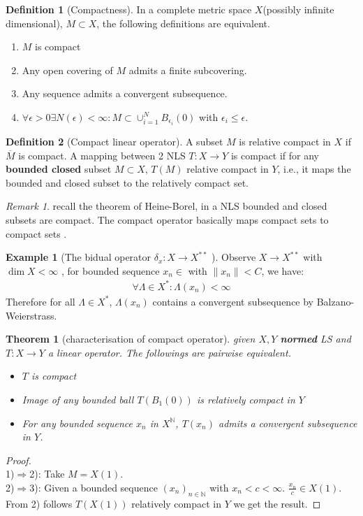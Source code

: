 \documentclass[a4paper,11pt,fleqn]{book}
\newtheorem{theorem}{Theorem}[section]
\theoremstyle{definition}
\newtheorem{definition}{Definition}[section]
\newtheorem*{example}{Example}
\theoremstyle{remark}
\newtheorem*{remark}{Remark}
\begin{document}
\begin{definition}[Compactness]
	In a complete metric space $X$(possibly infinite dimensional), $M \subset X$, the following definitions are equivalent.
	\begin{enumerate}
		\item $M$ is compact
		\item Any open covering of $M$ admits a finite subcovering.
		\item Any sequence admits a convergent subsequence. 
		\item $\forall \epsilon > 0 \exists N(\epsilon) < \infty: M \subset \cup_{i = 1}^N B_{\epsilon_i}(0)$ with $\epsilon_i \le \epsilon$. 
	\end{enumerate}
\end{definition}


\begin{definition}[Compact linear operator]
	A subset $M$ is relative compact in $X$ if $\overline{M}$ is compact. A mapping between 2 NLS $T:X\rightarrow Y$ is compact if for any \textbf{bounded closed} subset $M \subset X$, $T(M)$ relative compact in $Y$, i.e., it maps the bounded and closed subset to the relatively compact set. 
\end{definition}
\begin{remark}
recall the theorem of Heine-Borel, in a NLS bounded and closed subsets are compact. The compact operator basically maps compact sets to compact sets	.
\end{remark}


\begin{example}[The bidual operator $\delta_x: X \rightarrow X^{**}$ ]
	Observe $X \rightarrow X^{**}$ with $\dim X < \infty$ , for bounded sequence $x_n \in $ with $\|x_n\| < C$, we have:
	\begin{align*}
		\forall \Lambda \in X^*: \Lambda(x_n)< \infty
	\end{align*} 
	Therefore for all $\Lambda \in X^*$, $\Lambda(x_n)$ contains a convergent subsequence by Balzano-Weierstrass.
\end{example}


\begin{theorem}[characterisation of compact operator]
	given $X, Y$ \textbf{normed} LS and $T:X \rightarrow Y$ a linear operator. The followings are pairwise equivalent.
	\begin{itemize}
		\item $T$ is compact
		\item Image of any bounded ball $T(B_1(0))$ is relatively compact in $Y$
		\item For any bounded sequence $x_n$ in $X^{\mathbb{N}}$, $T(x_n)$ admits a convergent subsequence in $Y$.
	\end{itemize}
\end{theorem}
\begin{proof}\quad\\
	1)$\Rightarrow$2): Take $M = X(1)$.\\
	2)$\Rightarrow$3): Given a bounded sequence $(x_n)_{n \in \mathbb{N}}$ with $x_n < c < \infty$. $\frac{x_n}{c} \in X(1)$.  From 2) follows $T(X(1))$ relatively compact in $Y$ we get the result.
\end{proof}
\end{document}
